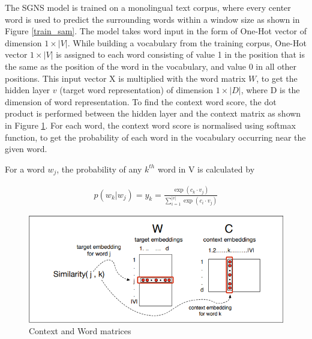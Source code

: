 \documentclass[12pt]{report} %
\begin{document}


The SGNS model is trained on a monolingual text corpus, where every center word is used to predict the surrounding words within a window size as shown  in Figure \ref{train_sam}.
The model takes word input in the form of One-Hot vector of dimension $1\times|V|$. While building a vocabulary from the training corpus, One-Hot vector $1\times|V|$ is assigned to each word consisting of value 1 in the position that is the same as the position of the word in the vocabulary, and value 0 in all other positions. This input vector X is multiplied with the word matrix $W$, to get the hidden layer $v$ (target word representation) of dimension $1\times|D|$, where D is the dimension of word representation. To find the context word score, the dot product is performed between the hidden layer and the context matrix as shown in Figure \ref{C_W_matrics}. For each word, the context word score is normalised using softmax function, to get the probability of each word in the vocabulary occurring near the given word. 



For a word $w_{j}$, the probability of any $k^{th}$ word in V is calculated by

\begin{align}
p(w_{k} | w_{j}) = y_{k} = \frac{\exp( c_{k} \cdot v_{j})}{\sum_{i=1}^{|v|} \exp(c_{i} \cdot v_{j}) }
\end{align}

\begin{figure}[!tbp]
	\centering
	\includegraphics[scale=0.50]{image/cbows.png}
	\caption{Context and Word matrices \citep{jurafsky2014speech}}
	\label{C_W_matrics}
\end{figure}
\end{document}
